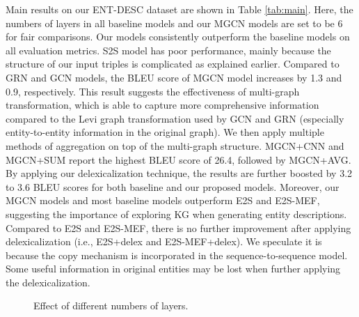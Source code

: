 \documentclass[11pt,a4paper]{article}
\begin{document}
Main results on our ENT-DESC dataset are shown in Table \ref{tab:main}.
Here, the numbers of layers in all baseline models and our MGCN models are set to be 6 for fair comparisons.
Our models consistently outperform the baseline models on all evaluation metrics.
S2S model has poor performance, mainly because the structure of our input triples is complicated as explained earlier.
Compared to GRN and GCN models, the BLEU score of MGCN model increases by 1.3 and 0.9, respectively. 
This result suggests the effectiveness of multi-graph transformation, which is able to capture more comprehensive information compared to the Levi graph transformation used by GCN and GRN (especially entity-to-entity information in the original graph). 
We then apply multiple methods of aggregation on top of the multi-graph structure.
MGCN+CNN and MGCN+SUM report the highest BLEU score of 26.4, followed by MGCN+AVG.
By applying our delexicalization technique, the results are further boosted by 3.2 to 3.6 BLEU scores for both baseline and our proposed models.
Moreover, our MGCN models and most baseline models outperform E2S and E2S-MEF, suggesting the importance of exploring KG when generating entity descriptions.
Compared to E2S and E2S-MEF, there is no further improvement after applying delexicalization (i.e., E2S+delex and E2S-MEF+delex). We speculate it is because the copy mechanism is incorporated in the sequence-to-sequence model. Some useful information in original entities may be lost when further applying the delexicalization.

\begin{figure}
\caption{Effect of different numbers of layers.}
\label{fig:layer_res}
\end{figure}
\end{document}
